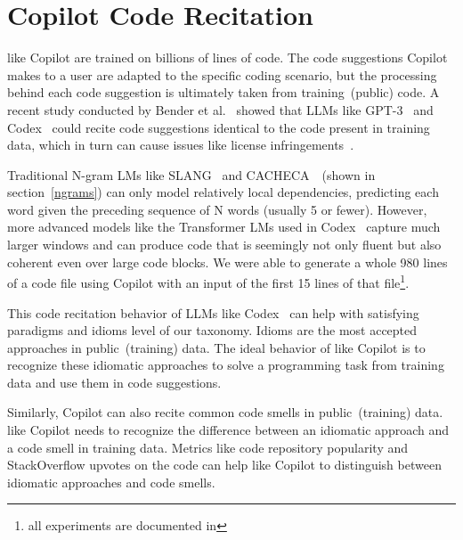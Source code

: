 \section{Copilot Code Recitation}
\label{recite}

\cct{} like Copilot are trained on billions of lines of code. The code suggestions Copilot makes to a user are adapted to the specific coding scenario, but the processing behind each code suggestion is ultimately taken from training~(public) code.
A recent study conducted by Bender et al.~\cite{stochastic_parrots} showed that LLMs like GPT-3~\cite{Gpt3} and Codex~\cite{copilot} could recite code suggestions identical to the code present in training data, which in turn can cause issues like license infringements~\cite{code_clone}.

Traditional N-gram LMs like SLANG~\cite{slang} and CACHECA~\cite{cacheca}~(shown in section~\ref{ngrams}) can only model relatively local dependencies, predicting each word given the preceding sequence of N words (usually 5 or fewer).
However, more advanced models like the Transformer LMs used in Codex~\cite{copilot} capture much larger windows and can produce code that is seemingly not only fluent but also coherent even over large code blocks. We were able to generate a whole 980 lines of a code file using Copilot with an input of the first 15 lines of that file\footnote{all experiments are documented in \repl{}}.  

This code recitation behavior of LLMs like Codex~\cite{copilot} can help with satisfying paradigms and idioms level of our taxonomy.
Idioms are the most accepted approaches in public~(training) data. 
The ideal behavior of \cct{} like Copilot is to recognize these idiomatic approaches to solve a programming task from training data and use them in code suggestions.

Similarly, Copilot can also recite common code smells in public~(training) data. \cct{} like Copilot needs to recognize the difference between an idiomatic approach and a code smell in training data. 
Metrics like code repository popularity and StackOverflow upvotes on the code can help \cct{} like Copilot to distinguish between idiomatic approaches and code smells. 